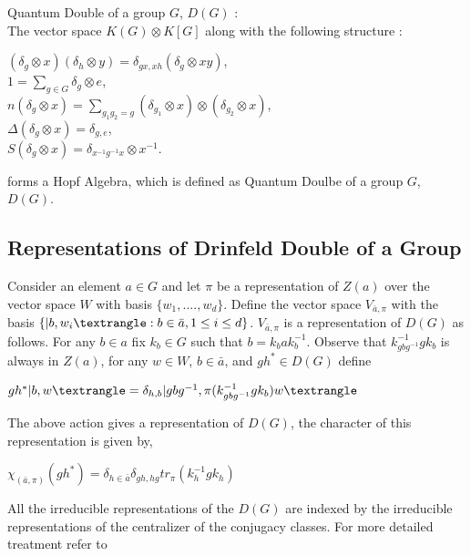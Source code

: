 \begin{defn}
Quantum Double of a group $G$, $D(G)$ : \\
    The vector space $K(G) \otimes K[G]$ along with the following structure :\\
\begin{center}
    $(\delta_{g} \otimes x)(\delta_{h} \otimes y) = \delta_{gx,xh}(\delta_{g} \otimes xy)$,\\
    $ 1 = \sum_{g \in G} \delta_{g} \otimes e$, \\
    $ n (\delta_{g} \otimes x) = \sum_{g_{1}g_{2} = g}(\delta_{g_{1}} \otimes x) \otimes (\delta_{g_{2}} \otimes x)$, \\
    $ \Delta(\delta_{g} \otimes x) = \delta_{g,e}$,\\
    $ S(\delta_{g} \otimes x) = \delta_{x^{-1}g^{-1}x} \otimes x^{-1}$.
\end{center}
\end{defn}
forms a Hopf Algebra, which is defined as Quantum Doulbe of a group $G$, $D(G)$.    

\subsection{Representations of Drinfeld Double of a Group}
    Consider an element $a \in G$ and let $\pi$ be a representation of $Z(a)$ over the vector space $W$ 
with basis $\{w_{1}, ...., w_{d}\}$. Define the vector space $V_{\bar{a}, \pi}$ with the basis 
$\{ |b, w_{i}\textrangle : b \in \bar{a}, 1 \leq i \leq d\}$. $V_{\bar{a}, \pi}$ is a representation of $D(G)$ as follows.
For any $b \in a$ fix $k_{b} \in G$ such that $b = k_{b}ak_{b}^{-1}$. Observe that $k_{gbg^{-1}}^{-1}gk_{b}$ is always
in $Z(a)$, for any $w \in W$, $b \in \bar{a}$, and $gh^{*} \in  D(G)$ define
\begin{center}
 $gh^{*}|b,w\textrangle = \delta_{h,b} |gbg^{-1}, \pi(k_{gbg^{-1}}^{-1}gk_{b})w\textrangle$
\end{center}
The above action gives a representation of $D(G)$, the character of this representation is given by,\\
\begin{center}
  $\chi_{(\bar{a}, \pi)}(gh^{*}) = \delta_{h \in \bar{a}}\delta_{gh,hg} tr_{\pi}(k_{h}^{-1}gk_{h})$
\end{center}

All the irreducible representations of the $D(G)$ are indexed by the irreducible representations of the centralizer of the conjugacy classes. 
For more detailed treatment refer to \citep{Reference1, Reference14}

